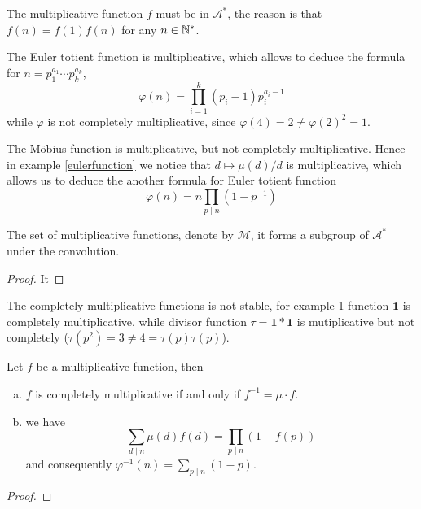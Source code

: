 \begin{remark}
    The multiplicative function \(f \) must be in \(\mathcal{A}^*\), the reason is that \(f(n) = f(1)f(n)\) for any \(n \in \mathbb{N}^*\).
\end{remark}

\begin{example}
    The Euler totient function is multiplicative, which allows to deduce the formula for \(n = p_1^{a_1} \cdots p_k^{a_k}\),
    \[\varphi(n) = \prod_{i = 1}^k (p_i - 1)p_i^{a_i-1}\]
    while \(\varphi\) is not completely multiplicative, since \(\varphi(4) = 2 \neq \varphi(2)^2 = 1\).
\end{example}

\begin{example}
    The Möbius function is multiplicative, but not completely multiplicative. Hence in example \ref{eulerfunction} we notice that \(d \mapsto \mu(d)/d\) is multiplicative, which allows us to deduce the another formula for Euler totient function
    \[\varphi(n) = n \prod_{p \mid n}(1-p^{-1})\]

\end{example}

\begin{colortheorem}
    The set of multiplicative functions, denote by \(\mathcal{M}\), it forms a subgroup of \(\mathcal{A}^*\) under the convolution.
\end{colortheorem}

\begin{proof}
    It
\end{proof}

\begin{remark}
    The completely multiplicative functions is not stable, for example 1-function \(\mathbf{1}\) is completely multiplicative, while divisor function \(\tau = \mathbf{1} * \mathbf{1}\) is mutiplicative but not completely (\(\tau(p^2) = 3 \neq 4 = \tau(p)\tau(p)\)).
\end{remark}

\begin{proposition}
    Let \(f\) be a multiplicative function, then 
    \begin{enumerate}[(a)]
        \item \(f\) is completely multiplicative if and only if \(f^{-1} = \mu \cdot f\).
        \item we have
        \[\sum_{d \mid n }\mu(d)f(d) = \prod_{p \mid n}(1-f(p))\]
        and consequently \(\varphi^{-1}(n) = \sum_{p \mid n }(1-p)\).
    \end{enumerate}
\end{proposition}
\begin{proof}
    
\end{proof}

